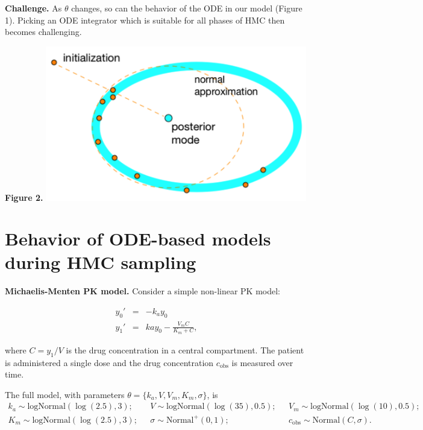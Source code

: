 \documentclass[21pt, custom, portrait, plainboxedsections]{sciposter}
\begin{document}
\begin{multicols}{3}
\setlength{\columnseprule}{0pt}
\begin{multicols}{2}
\textbf{Challenge.} As $\theta$ changes, so can the behavior of the ODE in our model (Figure 1).
Picking an ODE integrator which is suitable for all phases of HMC then becomes challenging.

\begin{center}
\textbf{Figure 2.}
\includegraphics[width = 4.5in]{../figures/pathfinder}
\end{center}

\columnbreak

\end{multicols}


\columnbreak

\section*{Behavior of ODE-based models during HMC sampling}

\textbf{Michaelis-Menten PK model.} Consider a simple non-linear PK model:
\begin{multicols}{2}
\begin{eqnarray*}
  y_0' & = & - k_a y_0  \\
  y_1' & = & ka y_0 - \frac{V_m C}{K_m + C},
\end{eqnarray*}

\columnbreak

where $C = y_1 / V$ is the drug concentration in a central compartment.
The patient is administered a single dose and the drug concentration $c_\text{obs}$ is measured over time.
\end{multicols}
The full model, with parameters $\theta = \{k_a, V, V_m, K_m, \sigma\}$, is
\begin{eqnarray*}
  k_a \sim \text{logNormal}(\log(2.5), 3) ; \ \ \
  & V \sim \text{logNormal}(\log(35), 0.5); & \ \ \
  V_m \sim \text{logNormal}(\log(10), 0.5) ;  \\
  K_m \sim \text{logNormal}(\log(2.5), 3); \ \ \
  & \sigma \sim \text{Normal}^+(0, 1); & \ \ \
  c_\text{obs} \sim \text{Normal}(C, \sigma).
\end{eqnarray*}


\end{multicols}
\end{document}
